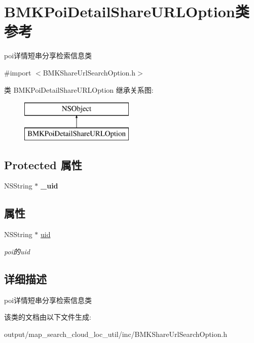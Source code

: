 \hypertarget{interface_b_m_k_poi_detail_share_u_r_l_option}{\section{B\+M\+K\+Poi\+Detail\+Share\+U\+R\+L\+Option类 参考}
\label{interface_b_m_k_poi_detail_share_u_r_l_option}
}


poi详情短串分享检索信息类  




{\ttfamily \#import $<$B\+M\+K\+Share\+Url\+Search\+Option.\+h$>$}

类 B\+M\+K\+Poi\+Detail\+Share\+U\+R\+L\+Option 继承关系图\+:\begin{figure}[H]
\begin{center}
\leavevmode
\includegraphics[height=2.000000cm]{interface_b_m_k_poi_detail_share_u_r_l_option}
\end{center}
\end{figure}
\subsection*{Protected 属性}
\begin{DoxyCompactItemize}
\item 
\hypertarget{interface_b_m_k_poi_detail_share_u_r_l_option_a5c9e2a4e4a0ccda38ae749a38f74184f}{N\+S\+String $\ast$ {\bfseries \+\_\+uid}}\label{interface_b_m_k_poi_detail_share_u_r_l_option_a5c9e2a4e4a0ccda38ae749a38f74184f}

\end{DoxyCompactItemize}
\subsection*{属性}
\begin{DoxyCompactItemize}
\item 
\hypertarget{interface_b_m_k_poi_detail_share_u_r_l_option_ae0e491dbe434887138d5d6022c0ad9e2}{N\+S\+String $\ast$ \hyperlink{interface_b_m_k_poi_detail_share_u_r_l_option_ae0e491dbe434887138d5d6022c0ad9e2}{uid}}\label{interface_b_m_k_poi_detail_share_u_r_l_option_ae0e491dbe434887138d5d6022c0ad9e2}

\begin{DoxyCompactList}\small\item\em poi的uid \end{DoxyCompactList}\end{DoxyCompactItemize}


\subsection{详细描述}
poi详情短串分享检索信息类 

该类的文档由以下文件生成\+:\begin{DoxyCompactItemize}
\item 
output/map\+\_\+search\+\_\+cloud\+\_\+loc\+\_\+util/inc/B\+M\+K\+Share\+Url\+Search\+Option.\+h\end{DoxyCompactItemize}
